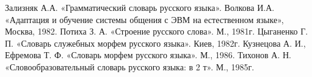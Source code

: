 \nocite{*}

\begin{thebibliography}{}
     Зализняк А.А. «Грамматический словарь русского языка».
     Волкова И.А. «Адаптация и обучение системы общения с ЭВМ на естественном языке», Москва, 1982.
     Потиха З. А. «Строение русского слова». М., 1981г.
     Цыганенко Г. П. «Словарь служебных морфем русского языка». Киев, 1982г.
     Кузнецова А. И., Ефремова Т. Ф. «Словарь морфем русского языка». М., 1986.
     Тихонов А. Н. «Словообразовательный словарь русского языка: в 2 т». М., 1985г.
\end{thebibliography}
